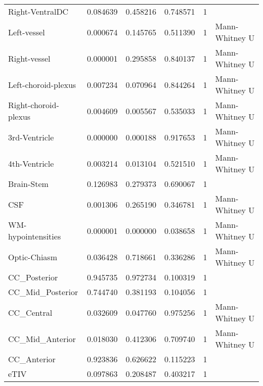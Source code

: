 \begin{tabular}{llllll}
Right-VentralDC & 0.084639 & 0.458216 & 0.748571 & 1 &  \\
Left-vessel & 0.000674 & 0.145765 & 0.511390 & 1 & Mann-Whitney U \\
Right-vessel & 0.000001 & 0.295858 & 0.840137 & 1 & Mann-Whitney U \\
Left-choroid-plexus & 0.007234 & 0.070964 & 0.844264 & 1 & Mann-Whitney U \\
Right-choroid-plexus & 0.004609 & 0.005567 & 0.535033 & 1 & Mann-Whitney U \\
3rd-Ventricle & 0.000000 & 0.000188 & 0.917653 & 1 & Mann-Whitney U \\
4th-Ventricle & 0.003214 & 0.013104 & 0.521510 & 1 & Mann-Whitney U \\
Brain-Stem & 0.126983 & 0.279373 & 0.690067 & 1 &  \\
CSF & 0.001306 & 0.265190 & 0.346781 & 1 & Mann-Whitney U \\
WM-hypointensities & 0.000001 & 0.000000 & 0.038658 & 1 & Mann-Whitney U \\
Optic-Chiasm & 0.036428 & 0.718661 & 0.336286 & 1 & Mann-Whitney U \\
CC_Posterior & 0.945735 & 0.972734 & 0.100319 & 1 &  \\
CC_Mid_Posterior & 0.744740 & 0.381193 & 0.104056 & 1 &  \\
CC_Central & 0.032609 & 0.047760 & 0.975256 & 1 & Mann-Whitney U \\
CC_Mid_Anterior & 0.018030 & 0.412306 & 0.709740 & 1 & Mann-Whitney U \\
CC_Anterior & 0.923836 & 0.626622 & 0.115223 & 1 &  \\
eTIV & 0.097863 & 0.208487 & 0.403217 & 1 &  \\
\bottomrule
\end{tabular}
